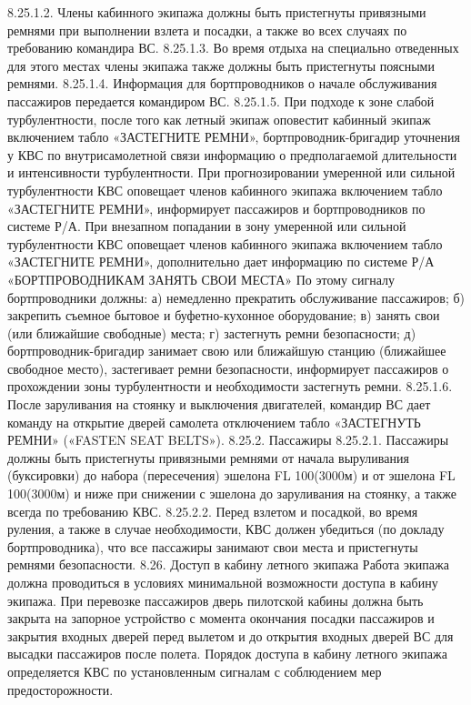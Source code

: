 8.25.1.2. Члены кабинного экипажа должны быть пристегнуты привязными ремнями при выполнении взлета и посадки, а также во всех случаях по требованию командира ВС.
8.25.1.3. Во время отдыха на специально отведенных для этого местах члены экипажа также должны быть пристегнуты поясными ремнями.
8.25.1.4. Информация для бортпроводников о начале обслуживания пассажиров передается командиром ВС.
8.25.1.5. При подходе к зоне слабой турбулентности, после того как летный экипаж оповестит кабинный экипаж включением табло «ЗАСТЕГНИТЕ РЕМНИ», бортпроводник-бригадир уточнения у КВС по внутрисамолетной связи информацию о предполагаемой длительности и интенсивности турбулентности.
При прогнозировании умеренной или сильной турбулентности КВС оповещает членов кабинного экипажа включением табло «ЗАСТЕГНИТЕ РЕМНИ», информирует пассажиров и бортпроводников по системе Р/А.
При внезапном попадании в зону умеренной или сильной турбулентности КВС оповещает членов кабинного экипажа включением табло «ЗАСТЕГНИТЕ РЕМНИ», дополнительно дает информацию по системе Р/А «БОРТПРОВОДНИКАМ ЗАНЯТЬ СВОИ МЕСТА»
По этому сигналу бортпроводники должны:
а)	немедленно прекратить обслуживание пассажиров;
б)	закрепить съемное бытовое и буфетно-кухонное оборудование;
в)	занять свои (или ближайшие свободные) места;
г)	застегнуть ремни безопасности;	
д)	бортпроводник-бригадир занимает свою или ближайшую станцию (ближайшее свободное место), застегивает ремни безопасности, информирует пассажиров о прохождении зоны турбулентности и необходимости застегнуть ремни.
8.25.1.6. После заруливания на стоянку и выключения двигателей, командир ВС дает команду на открытие дверей самолета отключением табло «ЗАСТЕГНУТЬ РЕМНИ» («FASTEN SEAT BELTS»).
8.25.2. Пассажиры
8.25.2.1. Пассажиры должны быть пристегнуты привязными ремнями от начала выруливания (буксировки) до набора (пересечения) эшелона FL 100(3000м) и от эшелона FL 100(3000м) и ниже при снижении с эшелона до заруливания на стоянку, а также всегда по требованию КВС.
8.25.2.2. Перед взлетом и посадкой, во время руления, а также в случае необходимости, КВС должен убедиться (по докладу бортпроводника), что все пассажиры занимают свои места и пристегнуты ремнями безопасности.
8.26. Доступ в кабину летного экипажа
Работа экипажа должна проводиться в условиях минимальной возможности доступа в кабину экипажа.
При перевозке пассажиров дверь пилотской кабины должна быть закрыта на запорное устройство с момента окончания посадки пассажиров и закрытия входных дверей перед вылетом и до открытия входных дверей ВС для высадки пассажиров после полета. Порядок доступа в кабину летного экипажа определяется КВС по установленным сигналам с соблюдением мер предосторожности.	
